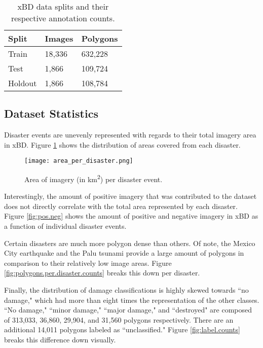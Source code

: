 \documentclass[10pt,twocolumn,letterpaper]{article}
\begin{document}
\begin{table}[!h]
	\begin{tabularx}{\columnwidth}{X|X|X}
		\hline
		\textbf{Split} & \textbf{Images} & \textbf{Polygons} \\
		\hline 
		Train & 18,336 & 632,228 \\ 
		\hline 
		Test & 1,866 & 109,724 \\
		\hline
		Holdout & 1,866 & 108,784 \\
		\hline
	\end{tabularx}
	\caption{xBD data splits and their respective annotation counts.}
	\label{table:split.counts}
\end{table}

\subsection{Dataset Statistics}
Disaster events are unevenly represented with regards to their total imagery area in xBD.
Figure \ref{fig:area.per.disaster} shows the distribution of areas covered from each disaster.
\begin{figure}[!h]
	\begin{center}
		\texttt{[image: area\_per\_disaster.png]}
	\end{center}
	\caption{Area of imagery (in km\textsuperscript{2}) per disaster event.}
	\label{fig:area.per.disaster}
\end{figure}

Interestingly, the amount of positive imagery that was contributed to the dataset does not directly correlate with the total area represented by each disaster.
Figure \ref{fig:pos.neg} shows the amount of positive and negative imagery in xBD as a function of individual disaster events.

Certain disasters are much more polygon dense than others.
Of note, the Mexico City earthquake and the Palu tsunami provide a large amount of polygons in comparison to their relatively low image areas.
Figure \ref{fig:polygons.per.disaster.counts} breaks this down per disaster.

Finally, the distribution of damage classifications is highly skewed towards ``no damage," which had more than eight times the representation of the other classes.
``No damage," ``minor damage," ``major damage," and ``destroyed" are composed of 313,033, 36,860, 29,904, and 31,560 polygons respectively.
There are an additional 14,011 polygons labeled as ``unclassified." Figure \ref{fig:label.counts} breaks this difference down visually.
\end{document}
